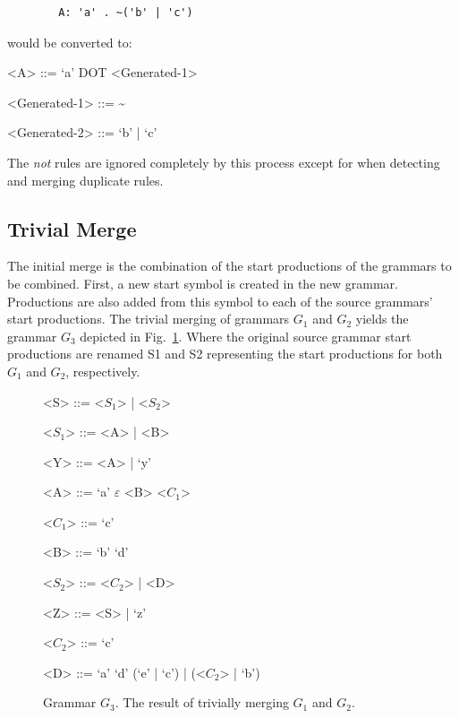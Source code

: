 \documentclass[conference]{IEEEtran}
\begin{document}
\begin{verbatim}
        A: 'a' . ~('b' | 'c')
\end{verbatim}

\noindent would be converted to:

\begin{grammar}
      <A> ::= `a' DOT <Generated-1>

      <Generated-1> ::= \textasciitilde<Generated-2>

      <Generated-2> ::= `b' | `c'

\end{grammar}

\noindent The \emph{not} rules are ignored completely by this process
except for when detecting and merging duplicate rules.

\hypertarget{sec:trivial_merge}{%
\subsection{Trivial Merge}\label{sec:trivial_merge}}

The initial merge is the combination of the start productions of the
grammars to be combined. First, a new start symbol is created in the new
grammar. Productions are also added from this symbol to each of the
source grammars' start productions. The trivial merging of grammars
\(G_1\) and \(G_2\) yields the grammar \(G_3\) depicted in
Fig.~\ref{fig:grammar_g3}. Where the original source grammar start
productions are renamed S1 and S2 representing the start productions for
both \(G_1\) and \(G_2\), respectively.

\begin{figure}[tb]
 \centering
  \begin{minipage}[t]{.2\textwidth}

\begin{grammar}
<S> ::= <\(S_1\)> | <\(S_2\)>

<$S_1$> ::= <A> | <B>

<Y> ::= <A> | `y'

<A> ::= `a' $\varepsilon$ <B> <\(C_1\)>

<$C_1$> ::= `c'

<B> ::= `b' `d'

<$S_  2$> ::= <\(C_2\)> | <D>

<Z> ::= <S> | `z'

<$C_2$> ::= `c'

<D> ::= `a' `d' (`e' | `c') | (<\(C_2\)> | `b')

\end{grammar}

  \end{minipage}
 \caption{Grammar $G_3$. The result of trivially merging $G_1$ and $G_2$.}\label{fig:grammar_g3}
\end{figure}
\end{document}
